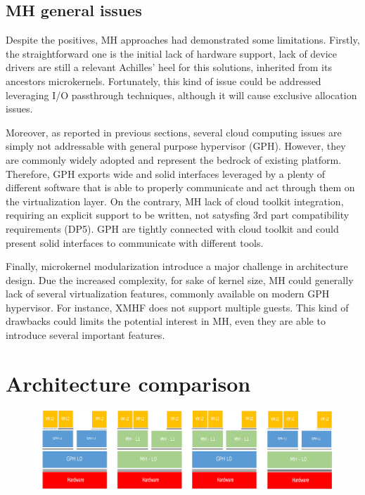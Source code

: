 \documentclass{sig-alternate}
\begin{document}
\subsection {MH general issues}

Despite the positives, MH approaches had demonstrated some limitations. Firstly, the straightforward one is the initial lack of hardware support, lack of device drivers are still a relevant Achilles' heel for this solutions, inherited from its ancestors microkernels. Fortunately, this kind of issue could be addressed leveraging I/O passthrough techniques, although it will cause exclusive allocation issues.

Moreover, as reported in previous sections, several cloud computing issues are simply not addressable with general purpose hypervisor (GPH). However, they are commonly widely adopted and represent the bedrock of existing platform. Therefore, GPH exports wide and solid interfaces leveraged by a plenty of different software that is able to properly communicate and act through them on the virtualization layer. On the contrary, MH lack of cloud toolkit integration, requiring an explicit support to be written, not satysfing 3rd part compatibility requirements (DP5). GPH are tightly connected with cloud toolkit and could present solid interfaces to communicate with different tools. 

Finally, microkernel modularization introduce a major challenge in architecture design. Due the increased complexity, for sake of kernel size, MH could generally lack of several virtualization features, commonly available on modern GPH hypervisor. For instance, XMHF does not support multiple guests. This kind of drawbacks could limits the potential interest in MH, even they are able to introduce several important features.


\section{Architecture comparison}

\begin{figure}
\begin{center}
\includegraphics[width=2\columnwidth]{globalcut.png}
\end{center}
\caption{}
\label{fig:io}
\end{figure}
\end{document}
